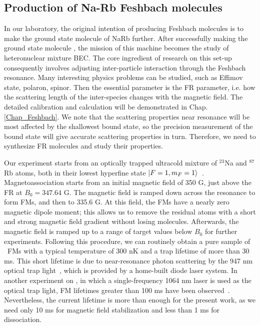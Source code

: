 \subsection{Production of Na-Rb Feshbach molecules}
In our laboratory, the original intention of producing Feshbach molecules is to make the ground state molecule of NaRb further. After successfully making the ground state molecule \cite{}, the mission of this machine becomes the study of heteronuclear mixture BEC. The core ingredient of research on this set-up consequently involves adjusting inter-particle interaction through the Feshbach resonance. Many interesting physics problems can be studied, such as Effimov state, polaron, spinor. Then the essential parameter is the FR parameter, i.e. how the scattering length of the inter-species changes with the magnetic field. The detailed calibration and calculation will be demonstrated in Chap. \ref{Chap_Feshbach}. We note that the scattering properties near resonance will be most affected by the shallowest bound state, so the precision measurement of the bound state will give accurate scattering properties in turn. Therefore, we need to synthesize FR molecules and study their properties.

Our experiment starts from an optically trapped ultracold mixture of $^{23}$Na and $^{87}$Rb atoms, both in their lowest hyperfine state $\ket{F = 1, m_F = 1}$~\cite{wang2013observation,wang2015formation,jia2020}. Magnetoassociation starts from an initial magnetic field of 350 G, just above the FR at $B_0 = 347.64$ G. The magnetic field is ramped down across the resonance to form FMs, and then to 335.6 G. At this field, the FMs have a nearly zero magnetic dipole moment; this allows us to remove the residual atoms with a short and strong magnetic field gradient without losing molecules. Afterwards, the magnetic field is ramped up to a range of target values below $B_0$ for further experiments. Following this procedure, we can routinely obtain a pure sample of \NaRb~FMs with a typical temperature of 300 nK and a trap lifetime of more than 30 ms. This short lifetime is due to near-resonance photon scattering by the 947 nm optical trap light~\cite{Guo2017,jia2020}, which is provided by a home-built diode laser system. In another experiment on \NaRb, in which a single-frequency 1064 nm laser is used as the optical trap light, FM lifetimes greater than 100 ms have been observed~\cite{Wang2019,guo2021leehuangyang}. Nevertheless, the current lifetime is more than enough for the present work, as we need only 10 ms for magnetic field stabilization and less than 1 ms for dissociation.

